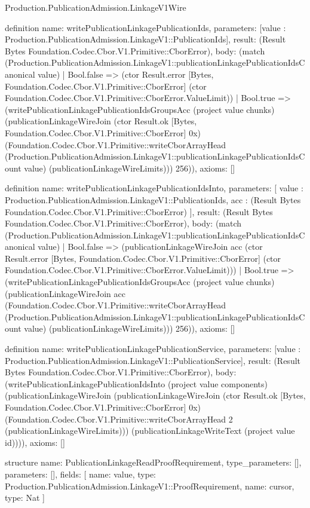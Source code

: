 \begin{lexlean}{Production.PublicationAdmission.LinkageV1Wire}
\begin{semanticmodule}
definition{
  name: writePublicationLinkagePublicationIds,
  parameters: [value : Production.PublicationAdmission.LinkageV1::PublicationIds],
  result: (Result Bytes Foundation.Codec.Cbor.V1.Primitive::CborError),
  body: (match (Production.PublicationAdmission.LinkageV1::publicationLinkagePublicationIdsCanonical value)
    | Bool.false => (ctor Result.error [Bytes, Foundation.Codec.Cbor.V1.Primitive::CborError] (ctor Foundation.Codec.Cbor.V1.Primitive::CborError.ValueLimit))
    | Bool.true => (writePublicationLinkagePublicationIdsGroupsAcc (project value chunks) (publicationLinkageWireJoin (ctor Result.ok [Bytes, Foundation.Codec.Cbor.V1.Primitive::CborError] 0x) (Foundation.Codec.Cbor.V1.Primitive::writeCborArrayHead (Production.PublicationAdmission.LinkageV1::publicationLinkagePublicationIdsCount value) (publicationLinkageWireLimits))) 256)),
  axioms: []
}

definition{
  name: writePublicationLinkagePublicationIdsInto,
  parameters: [
    value : Production.PublicationAdmission.LinkageV1::PublicationIds,
    acc : (Result Bytes Foundation.Codec.Cbor.V1.Primitive::CborError)
  ],
  result: (Result Bytes Foundation.Codec.Cbor.V1.Primitive::CborError),
  body: (match (Production.PublicationAdmission.LinkageV1::publicationLinkagePublicationIdsCanonical value)
    | Bool.false => (publicationLinkageWireJoin acc (ctor Result.error [Bytes, Foundation.Codec.Cbor.V1.Primitive::CborError] (ctor Foundation.Codec.Cbor.V1.Primitive::CborError.ValueLimit)))
    | Bool.true => (writePublicationLinkagePublicationIdsGroupsAcc (project value chunks) (publicationLinkageWireJoin acc (Foundation.Codec.Cbor.V1.Primitive::writeCborArrayHead (Production.PublicationAdmission.LinkageV1::publicationLinkagePublicationIdsCount value) (publicationLinkageWireLimits))) 256)),
  axioms: []
}

definition{
  name: writePublicationLinkagePublicationService,
  parameters: [value : Production.PublicationAdmission.LinkageV1::PublicationService],
  result: (Result Bytes Foundation.Codec.Cbor.V1.Primitive::CborError),
  body: (writePublicationLinkagePublicationIdsInto (project value components) (publicationLinkageWireJoin (publicationLinkageWireJoin (ctor Result.ok [Bytes, Foundation.Codec.Cbor.V1.Primitive::CborError] 0x) (Foundation.Codec.Cbor.V1.Primitive::writeCborArrayHead 2 (publicationLinkageWireLimits))) (publicationLinkageWriteText (project value id)))),
  axioms: []
}

structure{
  name: PublicationLinkageReadProofRequirement,
  type_parameters: [],
  parameters: [],
  fields: [
    {name: value, type: Production.PublicationAdmission.LinkageV1::ProofRequirement},
    {name: cursor, type: Nat}
  ]
}


\end{semanticmodule}
\end{lexlean}
